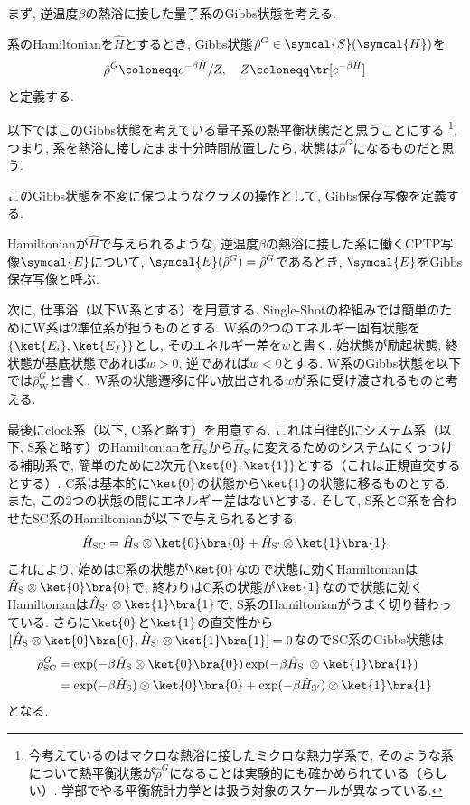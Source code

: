 
まず, 逆温度$\beta$の熱浴に接した量子系のGibbs状態を考える. 
\begin{mydfn}[Gibbs状態]
  系のHamiltonianを$\hat{H}$とするとき, Gibbs状態$\hat{\rho}^G\in\symcal{S}(\symcal{H})$を
  \begin{equation}
    \hat{\rho}^G\coloneqq e^{-\beta\hat{H}}/Z, \quad  Z\coloneqq \tr[e^{-\beta\hat{H}}]
  \end{equation}
  と定義する. 
\end{mydfn}
以下ではこのGibbs状態を考えている量子系の熱平衡状態だと思うことにする
\footnote{今考えているのはマクロな熱浴に接したミクロな熱力学系で, そのような系について熱平衡状態が$\hat{\rho}^G$になることは実験的にも確かめられている（らしい）\cite{SagawaSaizensen}. 学部でやる平衡統計力学とは扱う対象のスケールが異なっている. }. 
つまり, 系を熱浴に接したまま十分時間放置したら, 状態は$\hat{\rho}^{G}$になるものだと思う.  

このGibbs状態を不変に保つようなクラスの操作として, Gibbs保存写像を定義する. 
\begin{mydfn}[Gibbs保存写像]
  Hamiltonianが$\hat{H}$で与えられるような, 逆温度$\beta$の熱浴に接した系に働くCPTP写像$\symcal{E}$について, $\symcal{E}(\hat{\rho}^G)=\hat{\rho}^G$であるとき, $\symcal{E}$をGibbs保存写像と呼ぶ. 
\end{mydfn}

次に, 仕事浴（以下W系とする）を用意する. 
Single-Shotの枠組みでは簡単のためにW系は2準位系が担うものとする. 
W系の2つのエネルギー固有状態を$\{\ket{E_i}, \ket{E_f}\}$とし, そのエネルギー差を$w$と書く. 
始状態が励起状態, 終状態が基底状態であれば$w>0$, 逆であれば$w<0$とする. 
W系のGibbs状態を以下では$\hat{\rho}_{\text{W}}^{G}$と書く. 
W系の状態遷移に伴い放出される$w$が系に受け渡されるものと考える. 

最後にclock系（以下, C系と略す）を用意する. 
これは自律的にシステム系（以下, S系と略す）のHamiltonianを$\hat{H}_\text{S}$から$\hat{H}_\text{S'}$に変えるためのシステムにくっつける補助系で, 簡単のために2次元$\{\ket{0}, \ket{1}\}$とする（これは正規直交するとする）. 
C系は基本的に$\ket{0}$の状態から$\ket{1}$の状態に移るものとする. 
また, この2つの状態の間にエネルギー差はないとする. 
そして, S系とC系を合わせたSC系のHamiltonianが以下で与えられるとする. 
\begin{equation}
  \hat{H}_{\text{SC}}=\hat{H}_{\text{S}}\otimes\ket{0}\bra{0}+\hat{H}_{\text{S'}}\otimes\ket{1}\bra{1}
\end{equation}
これにより, 始めはC系の状態が$\ket{0}$なので状態に効くHamiltonianは$\hat{H}_{\text{S}}\otimes\ket{0}\bra{0}$で, 終わりはC系の状態が$\ket{1}$なので状態に効くHamiltonianは$\hat{H}_{\text{S}'}\otimes\ket{1}\bra{1}$で, S系のHamiltonianがうまく切り替わっている. 
さらに$\ket{0}$と$\ket{1}$の直交性から$[\hat{H}_{\text{S}}\otimes\ket{0}\bra{0}, \hat{H}_{\text{S'}}\otimes\ket{1}\bra{1}]=0$なのでSC系のGibbs状態は
\begin{align}
  \hat{\rho}_{\text{SC}}^G&=\exp(-\beta\hat{H}_{\text{S}}\otimes\ket{0}\bra{0})\exp(-\beta\hat{H}_{\text{S'}}\otimes\ket{1}\bra{1})\\
  &=\exp(-\beta\hat{H}_{\text{S}})\otimes\ket{0}\bra{0}+\exp(-\beta\hat{H}_{\text{S}'})\otimes\ket{1}\bra{1}
\end{align}
となる. 


